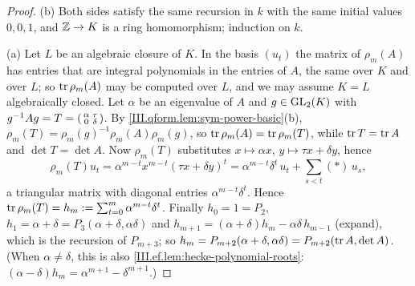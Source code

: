 \begin{theorem}
\end{theorem}
\begin{proof}
(b) Both sides satisfy the same recursion in $k$ with the same initial values $0,0,1$, and $\mathbb{Z}\to K$ is a ring homomorphism; induction on $k$.

(a) Let $L$ be an algebraic closure of $K$. In the basis $(u_t)$ the matrix of $\rho_m(A)$ has entries that are integral polynomials in the
entries of $A$, the same over $K$ and over $L$; so $\operatorname{tr}\rho_m(A)$ may be computed over $L$, and we may assume $K=L$ algebraically closed. Let
$\alpha$ be an eigenvalue of $A$ and $g\in\mathrm{GL}_2(K)$ with $g^{-1}Ag=T=\begin{psmallmatrix}\alpha&\tau\\0&\delta\end{psmallmatrix}$. By
\cref{III.qform.lem:sym-power-basic}(b), $\rho_m(T)=\rho_m(g)^{-1}\rho_m(A)\rho_m(g)$, so $\operatorname{tr}\rho_m(A)=\operatorname{tr}\rho_m(T)$, while $\operatorname{tr} T=\operatorname{tr} A$ and
$\det T=\det A$. Now $\rho_m(T)$ substitutes $x\mapsto\alpha x$, $y\mapsto\tau x+\delta y$, hence
\[
  \rho_m(T)u_t=\alpha^{m-t}x^{m-t}(\tau x+\delta y)^t=\alpha^{m-t}\delta^t\,u_t+\sum_{s<t}(\ast)\,u_s,
\]
a triangular matrix with diagonal entries $\alpha^{m-t}\delta^t$. Hence $\operatorname{tr}\rho_m(T)=h_m:=\sum_{t=0}^m\alpha^{m-t}\delta^t$. Finally
$h_0=1=P_2$, $h_1=\alpha+\delta=P_3(\alpha+\delta,\alpha\delta)$ and $h_{m+1}=(\alpha+\delta)h_m-\alpha\delta\,h_{m-1}$ (expand), which is the recursion of
$P_{m+3}$; so $h_m=P_{m+2}(\alpha+\delta,\alpha\delta)=P_{m+2}(\operatorname{tr} A,\det A)$. (When $\alpha\ne\delta$, this is also
\cref{III.ef.lem:hecke-polynomial-roots}: $(\alpha-\delta)h_m=\alpha^{m+1}-\delta^{m+1}$.)
\end{proof}

\begin{definition}
\end{definition}

